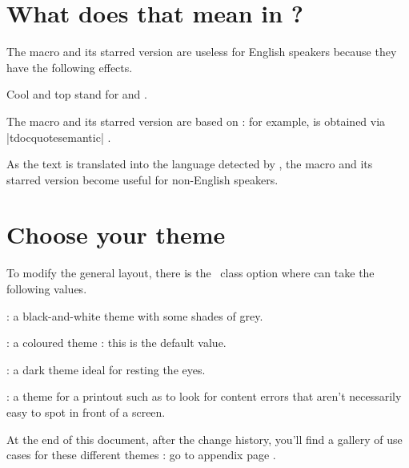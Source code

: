 \section{What does that mean in ?}

The macro  and its starred version are useless for English speakers because they have the following effects.


\begin{tdoclatex}
Cool and top stand for  and .
\end{tdoclatex}


The macro  and its starred version are based on  : for example,  is obtained via \tdoclatexin|tdocquote{semantic}| .


\begin{tdocnote}
    As the text  is translated into the language detected by \thisproj, the macro  and its starred version become useful for non-English speakers.
\end{tdocnote}


\section{Choose your theme}

To modify the general layout, there is the \thisproj\ class option  where  can take the following values.

\begin{tasks}[style=itemize]
    \task {}:
          a black-and-white theme with some shades of grey.

    \task {}:
          a coloured theme : this is the default value.

    \task {}:
          a dark theme ideal for resting the eyes.

    \task {}:
          a theme for a printout such as to look for content errors that aren't necessarily easy to spot in front of a screen.
\end{tasks}


\begin{tdocnote}
    At the end of this document, after the change history, you'll find a gallery of use cases for these different themes : go to appendix page \pageref{tutodoc-theme-gallery}.
\end{tdocnote}


